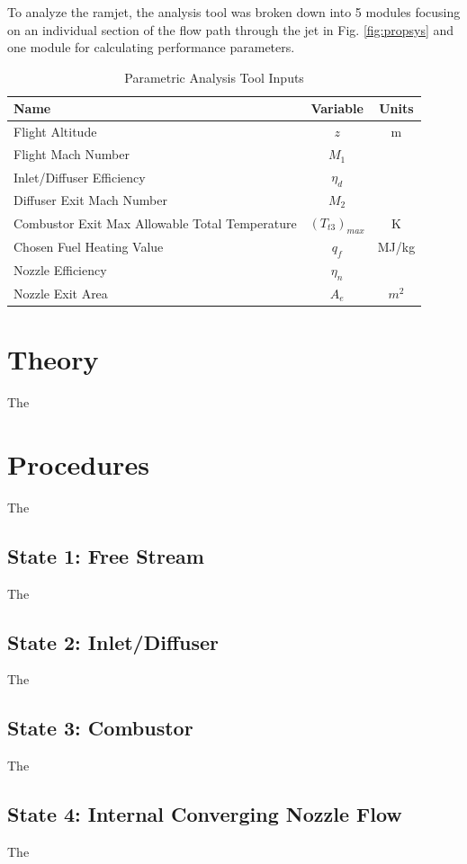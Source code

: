 \documentclass[conf]{new-aiaa} %
\begin{document}
To analyze the ramjet, the analysis tool was broken down into 5 modules focusing on an individual section of the flow path through the jet in Fig. \ref{fig:propsys} and one module for calculating performance parameters.

\begin{table}[hbt!]
\caption{\label{tab:table1} Parametric Analysis Tool Inputs}
\centering
\begin{tabular}{lcc}
\hline
Name& Variable& Units\\\hline
Flight Altitude& $z$& m\\
Flight Mach Number& $M_1$\\
Inlet/Diffuser Efficiency& $\eta_d$\\
Diffuser Exit Mach Number& $M_2$\\
Combustor Exit Max Allowable Total Temperature& $(T_{t3})_{max}$& K\\
Chosen Fuel Heating Value& $q_f$& MJ/kg\\
Nozzle Efficiency& $\eta_n$\\
Nozzle Exit Area& $A_e$& $m^2$\\
\hline
\end{tabular}
\end{table}


\section{Theory}
The

\section{Procedures}
The

\subsection{State 1: Free Stream}
The

\subsection{State 2: Inlet/Diffuser}
The

\subsection{State 3: Combustor}
The

\subsection{State 4: Internal Converging Nozzle Flow}
The
\end{document}
